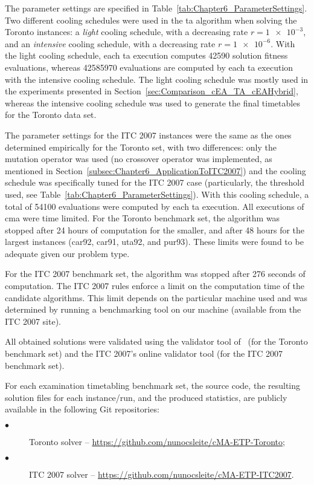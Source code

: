 The parameter settings are specified in Table~\ref{tab:Chapter6_ParameterSettings}. Two different cooling schedules were used in the \gls{ta} algorithm when solving the Toronto instances: a \textit{light} cooling schedule, with a decreasing rate $r = \num{1e-3}$, and an \textit{intensive} cooling schedule, with a decreasing rate $r = \num{1e-6}$. With the light cooling schedule, each \gls{ta} execution computes \num{42590} solution fitness evaluations, whereas \num{42585970} evaluations are computed by each \gls{ta} execution with the intensive cooling schedule. The light cooling schedule was mostly used in the experiments presented in Section~\ref{sec:Comparison_cEA_TA_cEAHybrid}, whereas the intensive cooling schedule was used to generate the final timetables for the Toronto data set. 

The parameter settings for the ITC 2007 instances were the same as the ones determined empirically for the Toronto set, with two differences: only the mutation operator was used (no crossover operator was implemented, as mentioned in Section~\ref{subsec:Chapter6_ApplicationToITC2007}) and the cooling schedule was specifically tuned for the ITC 2007 case (particularly, the threshold used, see Table~\ref{tab:Chapter6_ParameterSettings}). With this cooling schedule, a total of \num{54100} evaluations were computed by each \gls{ta} execution. All executions of \gls{cma} were time limited. For the Toronto benchmark set, the algorithm was stopped after 24 hours of computation for the smaller, and after 48 hours for the largest instances (car92, car91, uta92, and pur93). These limits were found to be adequate given our problem type.

For the ITC 2007 benchmark set, the algorithm was stopped after 276 seconds of computation. The ITC 2007 rules enforce a limit on the computation time of the candidate algorithms. This limit depends on the particular machine used and was determined by running a benchmarking tool on our machine (available from the ITC 2007 site).

All obtained solutions were validated using the validator tool of~\cite{Qu2009} (for the Toronto benchmark set) and the ITC 2007's online validator tool (for the ITC 2007 benchmark set).

For each examination timetabling benchmark set, the source code, the resulting solution files for each instance/run, and the produced statistics, are publicly available in the following Git repositories: 
\begin{description}
	\item[$\bullet$] Toronto solver -- \url{https://github.com/nunocsleite/cMA-ETP-Toronto};
	\item[$\bullet$] ITC 2007 solver -- \url{https://github.com/nunocsleite/cMA-ETP-ITC2007}.
\end{description}


